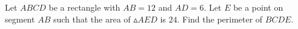 Let $ABCD$ be a rectangle with $AB = 12$ and $AD = 6$. Let $E$ be a point on segment $AB$ such that the area of $\vartriangle AED$ is $24$. Find the perimeter of $BCDE$.
